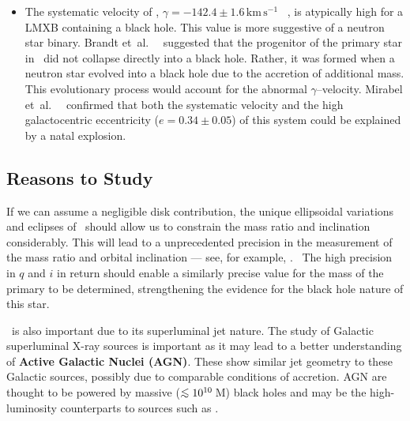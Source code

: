 \begin{itemize}
\item
The systematic velocity of \groj, $\gamma =
-142.4\pm1.6\,\mathrm{km\,s^{-1}}$~\cite{OroszBailyn:1997}%
, is atypically high for a LMXB containing a black hole. This value is
more suggestive of a neutron star binary. %
Brandt et~al.\ %
\citeyear{Brandt_et_al.:1995}%
\ suggested that the progenitor of the primary star in \groj\ did not
collapse directly into a black hole. Rather, it was formed when a
neutron star evolved into a black hole due to the accretion of
additional mass. This evolutionary process would account for the
abnormal $\gamma$--velocity. Mirabel et~al.\ %
\citeyear{Mirabel_et_al.:2002:unchecked}%
\ confirmed that both the systematic velocity and the high
galactocentric eccentricity ($e=0.34\pm0.05$) of this system could be explained by a
natal explosion. %

\end{itemize}


\subsection{Reasons to Study \groj}\label{cha:GROJ1655-40:sec:IntroductionToJ1655:subsec:ReasonsToStudyJ1655}

If we can assume a negligible disk contribution, the unique
ellipsoidal variations and eclipses of \groj\ should allow us to constrain
the mass ratio and inclination considerably. This will lead to a unprecedented precision in the measurement of the
mass ratio and orbital inclination --- see, for example, %
.%
\ The high precision in $q$ and $i$ in return should enable a similarly precise value
for the mass of the primary to be determined, strengthening the
evidence for the black hole nature of this star. %

\vspace{\myparskip}

\groj\ is also important due to its superluminal jet nature. The study of Galactic superluminal X-ray sources is important as it
may lead to a better understanding of \textbf{Active Galactic Nuclei
(AGN)}. These show similar jet geometry to these Galactic sources,
possibly due to comparable conditions of accretion. AGN are thought to
be powered by massive ($\lsim 10^{10}$\,M\sun) black holes and may be the
high-luminosity counterparts to sources such as \groj. %

\vspace{\myparskip}

